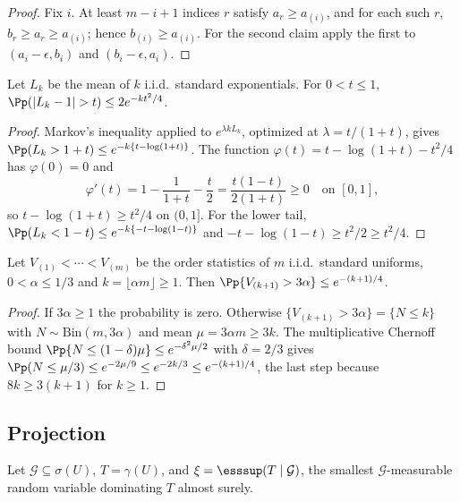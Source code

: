 \begin{proof}
Fix $i$.  At least $m-i+1$ indices $r$ satisfy $a_r\ge a_{(i)}$, and for
each such $r$, $b_r\ge a_r\ge a_{(i)}$; hence $b_{(i)}\ge a_{(i)}$.  For
the second claim apply the first to $(a_i-\epsilon,b_i)$ and
$(b_i-\epsilon,a_i)$.
\end{proof}

\begin{lemma}\label{lem:app-chernoff}
Let $L_k$ be the mean of $k$ i.i.d.\ standard exponentials.  For
$0<t\le1$,
$\Pp(|L_k-1|>t)\le2e^{-kt^2/4}$.
\end{lemma}

\begin{proof}
Markov's inequality applied to $e^{\lambda kL_k}$, optimized at
$\lambda=t/(1+t)$, gives
$\Pp(L_k>1+t)\le e^{-k\{t-\log(1+t)\}}$.  The function
$\varphi(t)=t-\log(1+t)-t^2/4$ has $\varphi(0)=0$ and
\[
 \varphi'(t)=1-\frac1{1+t}-\frac t2=\frac{t(1-t)}{2(1+t)}\ge0
 \quad\text{on }[0,1],
\]
so $t-\log(1+t)\ge t^2/4$ on $(0,1]$.  For the lower tail,
$\Pp(L_k<1-t)\le e^{-k\{-t-\log(1-t)\}}$ and
$-t-\log(1-t)\ge t^2/2\ge t^2/4$.
\end{proof}

\begin{lemma}\label{lem:app-threshold}
Let $V_{(1)}<\cdots<V_{(m)}$ be the order statistics of $m$ i.i.d.\
standard uniforms, $0<\alpha\le1/3$ and
$k=\lfloor\alpha m\rfloor\ge1$.  Then
$\Pp\{V_{(k+1)}>3\alpha\}\le e^{-(k+1)/4}$.
\end{lemma}

\begin{proof}
If $3\alpha\ge1$ the probability is zero.  Otherwise
$\{V_{(k+1)}>3\alpha\}=\{N\le k\}$ with
$N\sim\mathrm{Bin}(m,3\alpha)$ and mean $\mu=3\alpha m\ge3k$.  The
multiplicative Chernoff bound
$\Pp\{N\le(1-\delta)\mu\}\le e^{-\delta^2\mu/2}$
\citep[Section~2.2]{boucheronLugosiMassart2013} with $\delta=2/3$ gives
$\Pp(N\le\mu/3)\le e^{-2\mu/9}\le e^{-2k/3}\le e^{-(k+1)/4}$, the last
step because $8k\ge3(k+1)$ for $k\ge1$.
\end{proof}

\subsection{Projection}\label{app:projection}

Let $\mathcal G\subseteq\sigma(U)$, $T=\gamma(U)$, and
$\xi=\esssup(T\mid\mathcal G)$, the smallest $\mathcal G$-measurable random
variable dominating $T$ almost surely.

